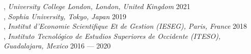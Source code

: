 
, \textit{University College London, London, United Kingdom}	\hfill 2021 
\vspace{5mm} \\

, \textit{Sophia University, Tokyo, Japan}	\hfill 2019
\vspace{5mm} \\

, \textit{Institut d'Economie Scientifique Et de Gestion (IESEG), Paris, France} \hfill	2018
\vspace{5mm} \\

, \textit{Instituto Tecnológico de Estudios Superiores de Occidente (ITESO), \\ Guadalajara, Mexico} \hfill 2016 --- 2020
